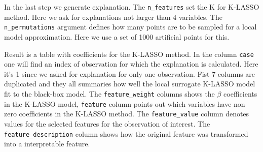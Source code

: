 \documentclass[12pt,]{krantz}
\newenvironment{Shaded}{\begin{snugshade}}{\end{snugshade}}
\newcommand{\CommentTok}[1]{\textcolor[rgb]{0.56,0.35,0.01}{\textit{#1}}}
\newcommand{\DataTypeTok}[1]{\textcolor[rgb]{0.13,0.29,0.53}{#1}}
\newcommand{\DecValTok}[1]{\textcolor[rgb]{0.00,0.00,0.81}{#1}}
\newcommand{\KeywordTok}[1]{\textcolor[rgb]{0.13,0.29,0.53}{\textbf{#1}}}
\newcommand{\NormalTok}[1]{#1}
\newcommand{\OperatorTok}[1]{\textcolor[rgb]{0.81,0.36,0.00}{\textbf{#1}}}
\newcommand{\StringTok}[1]{\textcolor[rgb]{0.31,0.60,0.02}{#1}}
\begin{document}
In the last step we generate explanation. The \texttt{n\_features} set the K for K-LASSO method. Here we ask for explanations not larger than 4 variables. The \texttt{n\_permutations} argument defines how many points are to be sampled for a local model approximation. Here we use a set of 1000 artificial points for this.

\begin{Shaded}
\end{Shaded}

Result is a table with coefficients for the K-LASSO method. In the column \texttt{case} one will find an index of observation for which the explanation is calculated. Here it's 1 since we asked for explanation for only one observation. Fist 7 columns are duplicated and they all summaries how well the local surrogate K-LASSO model fit to the black-box model.
The \texttt{feature\_weight} columns shows the \(\beta\) coefficients in the K-LASSO model, \texttt{feature} column points out which variables have non zero coefficients in the K-LASSO method. The \texttt{feature\_value} column denotes values for the selected features for the observation of interest. The \texttt{feature\_description} column shows how the original feature was transformed into a interpretable feature.
\end{document}
